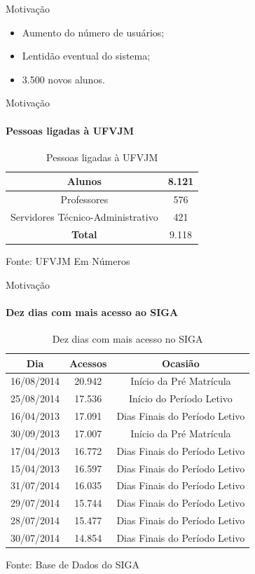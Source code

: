 \begin{frame}{Motivação}
	\begin{itemize}
		\item Aumento do número de usuários; \pause
		\item Lentidão eventual do sistema; \pause
		\item 3.500 novos alunos.
	\end{itemize}
\end{frame}
\begin{frame}{Motivação}
	\framesubtitle{Pessoas ligadas à UFVJM}
	\centering
	\begin{table}
		\caption{Pessoas ligadas à UFVJM}
		\begin{tabular}{|c|c|}
			\hline
			Alunos & 8.121 \\ \hline
			Professores & 576 \\ \hline
			Servidores Técnico-Administrativo & 421 \\ \hline
			\textbf{Total} & 9.118 \\ \hline
		\end{tabular}
	\end{table}
	Fonte: UFVJM Em Números
\end{frame}
\begin{frame}{Motivação}
	\framesubtitle{Dez dias com mais acesso ao SIGA}
	\centering
	\begin{table}
		\caption{Dez dias com mais acesso no SIGA}
		\begin{tabular}{|c|c|c|}
			\hline
			\textbf{Dia} & \textbf{Acessos}  & \textbf{Ocasião} \\ \hline
			16/08/2014 & 20.942 & Início da Pré Matrícula \\ \hline
			25/08/2014 & 17.536 & Início do Período Letivo \\ \hline
			16/04/2013 & 17.091 & Dias Finais do Período Letivo \\ \hline
			30/09/2013 & 17.007 & Início da Pré Matrícula \\ \hline
			17/04/2013 & 16.772 & Dias Finais do Período Letivo \\ \hline
			15/04/2013 & 16.597 & Dias Finais do Período Letivo \\ \hline
			31/07/2014 & 16.035 & Dias Finais do Período Letivo \\ \hline
			29/07/2014 & 15.744 & Dias Finais do Período Letivo \\ \hline
			28/07/2014 & 15.477 & Dias Finais do Período Letivo \\ \hline
			30/07/2014 & 14.854 & Dias Finais do Período Letivo \\ \hline
		\end{tabular}
	\end{table}
	Fonte: Base de Dados do SIGA
\end{frame}


